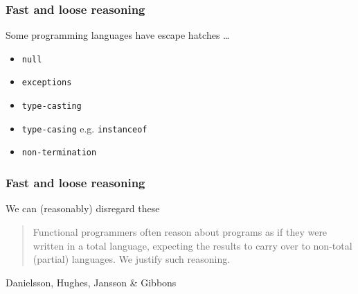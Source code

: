 \begin{frame}[fragile]
\frametitle{Fast and loose reasoning}
\begin{block}{Some programming languages have escape hatches \ldots}
\begin{itemize}
\item \lstinline{null}
\item \lstinline{exceptions}
\item \lstinline{type-casting}
\item \lstinline{type-casing} e.g. \lstinline{instanceof}
\item \lstinline{non-termination}
\end{itemize}
\end{block}
\end{frame}

\begin{frame}[fragile]
\frametitle{Fast and loose reasoning}
\begin{block}{We can (reasonably) disregard these}
\begin{center}
\begin{quotation}
Functional programmers often reason about programs as if
they were written in a total language, expecting the results
to carry over to non-total (partial) languages. We justify
such reasoning.
\end{quotation}
\end{center}
\end{block}
\tiny{Danielsson, Hughes, Jansson \& Gibbons \cite{danielsson2006fast}}
\end{frame}
